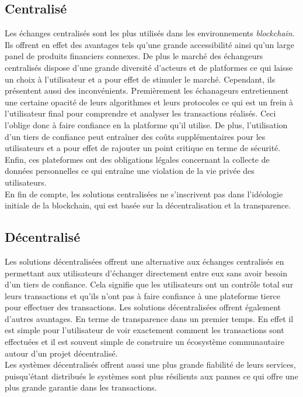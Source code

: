 \subsection{Centralisé} 
Les échanges centralisés sont les plus utilisés dans les environnements \textit{\gls{blockchain}}. Ils offrent en effet
des avantages tels qu'une grande accessibilité ainsi qu'un large panel de produits financiers connexes.
De plus le marché des échangeurs centralisés dispose d'une grande diversité d'acteurs et de platformes ce
qui laisse un choix à l'utilisateur et a pour effet de stimuler le marché. 
Cependant, ils présentent aussi des inconvénients. Premièrement les échanageurs entretiennent une certaine opacité 
de leurs algorithmes et leurs protocoles ce qui est un frein à l'utilisateur final pour comprendre et analyser 
les transactions réalisés. Ceci l'oblige donc à faire confiance en la platforme qu'il utilise. 
De plus, l’utilisation d’un tiers de confiance peut entraîner des coûts supplémentaires pour 
les utilisateurs et a pour effet de rajouter un point critique en terme de sécurité. Enfin,  ces plateformes ont 
des obligations légales concernant la collecte de données personnelles ce qui entraîne une violation de la vie 
privée des utilisateurs. \\
En fin de compte, les solutions centralisées ne s’inscrivent pas dans l’idéologie initiale de la blockchain, qui est 
basée sur la décentralisation et la transparence.

\subsection{Décentralisé}
Les solutions décentralisées offrent une alternative aux échanges centralisés en permettant aux utilisateurs 
d’échanger directement entre eux sans avoir besoin d’un tiers de confiance. Cela signifie que les utilisateurs 
ont un contrôle total sur leurs transactions et qu’ils n’ont pas à faire confiance à une plateforme tierce pour 
effectuer des transactions. Les solutions décentralisées offrent également d'autres avantages. En terme de 
transparence dans un premier temps. En effet il est simple pour l'utilisateur de voir exactement comment les 
transactions sont effectuées et il est souvent simple de construire un écosystème communautaire autour d'un projet
décentralisé. \\
Les systèmes décentralisés offrent aussi une plus grande fiabilité de leurs services, puisqu'étant distribués 
le systèmes sont plus résilients aux pannes ce qui offre une plus grande garantie dans les transactions.

